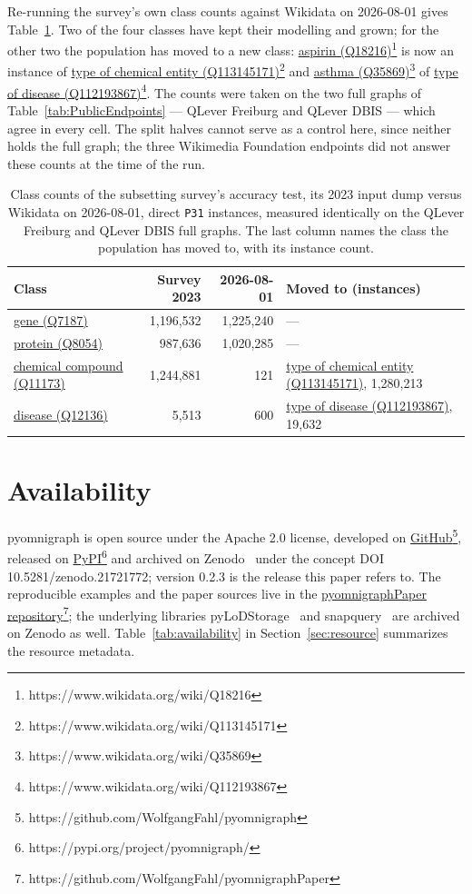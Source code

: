 \documentclass[
]{ceurart}
\newcommand{\footnotelink}[2]{\href{#1}{#2}\footnote{#1}}
\newcommand{\wdq}[2]{\footnotelink{https://www.wikidata.org/wiki/#2}{#1 (#2)}}
\newcommand{\wdqTable}[2]{\href{https://www.wikidata.org/wiki/#2}{#1 (#2)}}
\begin{document}
Re-running the survey's own class counts against Wikidata on 2026-08-01 gives
Table~\ref{tab:classrot}. Two of the four classes have kept their
modelling and grown; for the other two the population has moved to a new
class: \wdq{aspirin}{Q18216} is now an instance of
\wdq{type of chemical entity}{Q113145171} and
\wdq{asthma}{Q35869} of \wdq{type of disease}{Q112193867}.
The counts were taken on the two full graphs of
Table~\ref{tab:PublicEndpoints} --- QLever Freiburg and QLever DBIS ---
which agree in every cell. The split halves cannot serve as a control
here, since neither holds the full graph; the three Wikimedia Foundation
endpoints did not answer these counts at the time of the run.

\begin{table}
\caption{Class counts of the subsetting survey's accuracy test, its 2023
input dump versus Wikidata on 2026-08-01, direct \texttt{P31} instances,
measured identically on the QLever Freiburg and QLever DBIS full graphs.
The last column names the class the population has moved to, with its
instance count.}
\label{tab:classrot}
\small
\begin{tabular}{lrrl}
\hline
Class & Survey 2023 & 2026-08-01 & Moved to (instances) \\
\hline
\wdqTable{gene}{Q7187}     & 1,196,532 & 1,225,240 & --- \\
\wdqTable{protein}{Q8054}  &   987,636 & 1,020,285 & --- \\
\wdqTable{chemical compound}{Q11173} & 1,244,881 & 121 & \wdqTable{type of chemical entity}{Q113145171}, 1,280,213 \\
\wdqTable{disease}{Q12136} &     5,513 &       600 & \wdqTable{type of disease}{Q112193867}, 19,632 \\
\hline
\end{tabular}
\end{table}

\section{Availability}\label{sec:availability}
pyomnigraph is open source under the Apache 2.0 license, developed on \footnotelink{https://github.com/WolfgangFahl/pyomnigraph}{GitHub}, released on \footnotelink{https://pypi.org/project/pyomnigraph/}{PyPI} and archived on Zenodo~\cite{pyomnigraph} under the concept DOI 10.5281/zenodo.21721772; version 0.2.3 is the release this paper refers to. The reproducible examples and the paper sources live in the \footnotelink{https://github.com/WolfgangFahl/pyomnigraphPaper}{pyomnigraphPaper repository}; the underlying libraries pyLoDStorage~\cite{pylodstorage} and snapquery~\cite{snapquery} are archived on Zenodo as well.
Table~\ref{tab:availability} in Section~\ref{sec:resource} summarizes the resource metadata.
\end{document}
